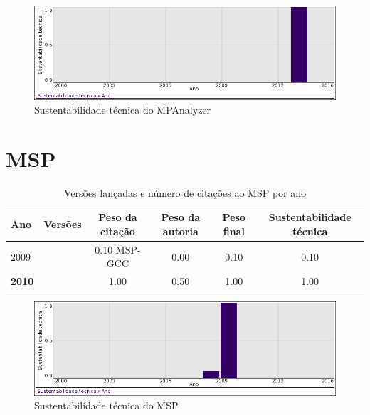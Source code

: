 \begin{figure}[h]
  \center
  \includegraphics[scale=0.50]{imagens/softwares-charts/mpanalyzer.png}
  \caption{Sustentabilidade técnica do MPAnalyzer}
\end{figure}


\section{MSP}


\begin{table}[H]
\caption{Versões lançadas e número de citações ao MSP por ano}
\centering
\begin{tabular}{| l | c | c | c | c | c |}
  \hline
  Ano & Versões & Peso da citação & Peso da autoria & Peso final & Sustentabilidade técnica \\
  \hline
            2009
          &
          
          &
          0.10
            {\tiny MSP-GCC}
          &
          0.00
          &
          0.10
          &
            {\color{red} 0.10}
          \\
\hline
            {\bf 2010}
          &
          
          &
          1.00
          &
          0.50
          &
          1.00
          &
            {\color{blue} 1.00}
          \\
\hline
\end{tabular}
\end{table}

\begin{figure}[h]
  \center
  \includegraphics[scale=0.50]{imagens/softwares-charts/msp.png}
  \caption{Sustentabilidade técnica do MSP}
\end{figure}


